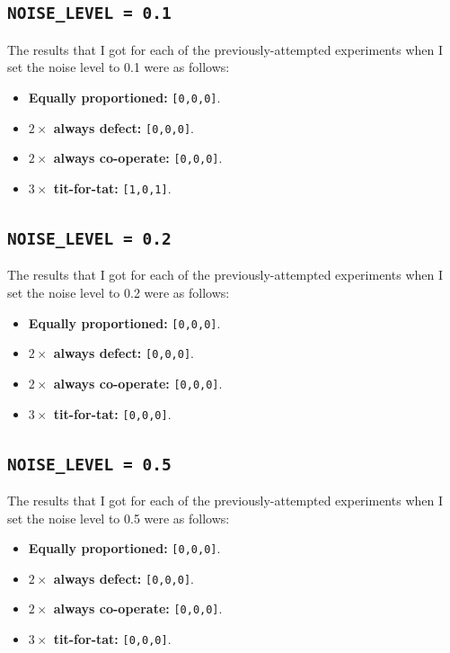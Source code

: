 \documentclass[a4paper]{article}
\begin{document}
\subsection{\texttt{NOISE_LEVEL = 0.1}}
The results that I got for each of the previously-attempted experiments when I set the noise level to 0.1 were as follows:
\begin{itemize}
    \item   \textbf{Equally proportioned:} \verb|[0,0,0]|.
    \item   \textbf{$2 \times$ always defect:} \verb|[0,0,0]|.
    \item   \textbf{$2 \times$ always co-operate:} \verb|[0,0,0]|.
    \item   \textbf{$3 \times$ tit-for-tat:} \verb|[1,0,1]|.
\end{itemize}

\subsection{\texttt{NOISE_LEVEL = 0.2}}
The results that I got for each of the previously-attempted experiments when I set the noise level to 0.2 were as follows:
\begin{itemize}
    \item   \textbf{Equally proportioned:} \verb|[0,0,0]|.
    \item   \textbf{$2 \times$ always defect:} \verb|[0,0,0]|.
    \item   \textbf{$2 \times$ always co-operate:} \verb|[0,0,0]|.
    \item   \textbf{$3 \times$ tit-for-tat:} \verb|[0,0,0]|.
\end{itemize}

\subsection{\texttt{NOISE_LEVEL = 0.5}}
The results that I got for each of the previously-attempted experiments when I set the noise level to 0.5 were as follows:
\begin{itemize}
    \item   \textbf{Equally proportioned:} \verb|[0,0,0]|.
    \item   \textbf{$2 \times$ always defect:}  \verb|[0,0,0]|.
    \item   \textbf{$2 \times$ always co-operate:} \verb|[0,0,0]|.
    \item   \textbf{$3 \times$ tit-for-tat:} \verb|[0,0,0]|.
\end{itemize}
\end{document}

